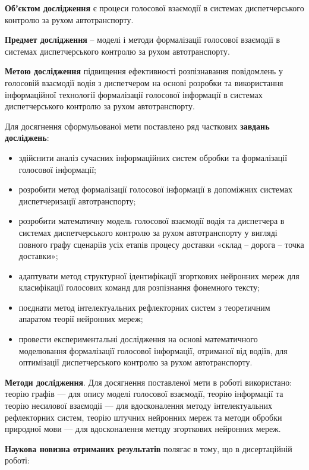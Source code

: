 \textbf{Обʼєктом дослідження} є процеси голосової взаємодії в системах диспетчерського контролю за рухом автотранспорту.

\textbf{Предмет дослідження} – моделі і методи формалізації голосової взаємодії в системах диспетчерського контролю за рухом автотранспорту.

\textbf{Метою дослідження} підвищення ефективності розпізнавання повідомлень у голосовій взаємодії водія з диспетчером на основі розробки та використання інформаційної технології формалізації голосової інформації в системах диспетчерського контролю за рухом автотранспорту.

Для досягнення сформульованої мети поставлено ряд часткових \textbf{завдань досліджень}:

\begin{itemize}
	\item здійснити аналіз сучасних інформаційних систем обробки та формалізації голосової інформації;
	\item розробити метод формалізації голосової інформації в допоміжних системах диспетчеризації автотранспорту;
	\item розробити математичну модель голосової взаємодії водія та диспетчера в системах диспетчерського контролю за рухом автотранспорту у вигляді повного графу сценаріїв усіх етапів процесу доставки «склад – дорога – точка доставки»;
	\item адаптувати метод структурної ідентифікації згорткових нейронних мереж для класифікації голосових команд для розпізнання фонемного тексту;
	\item поєднати метод інтелектуальних рефлекторних систем з теоретичним апаратом теорії нейронних мереж;
	\item провести експериментальні дослідження на основі математичного моделювання формалізації голосової інформації, отриманої від водіїв, для оптимізації диспетчерського контролю за рухом автотранспорту.
\end{itemize}

\textbf{Методи дослідження}. Для досягнення поставленої мети в роботі використано: теорію графів --- для опису моделі голосової взаємодії, теорію інформації та теорію несилової взаємодії --- для вдосконалення методу інтелектуальних рефлекторних систем, теорію штучних нейронних мереж та методи обробки природної мови --- для вдосконалення методу згорткових нейронних мереж.

\textbf{Наукова новизна отриманих результатів} полягає в тому, що в дисертаційній роботі:

